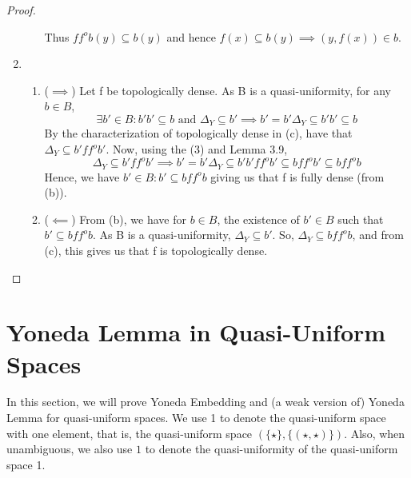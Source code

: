 \documentclass[a4paper]{article}
\theoremstyle{definition}
\begin{document}
\begin{proof}
\begin{enumerate}[label=(\alph*)]
\begin{enumerate}[label=(\roman*)]
					Thus $f f^o b(y) \subseteq b(y)$ and hence $f(x) \subseteq b(y) \implies
					(y,f(x)) \in b$.
			\end{enumerate}
		\item \begin{enumerate}[label=(\roman*)]
			\item
				($\implies $) Let f be topologically dense. As B is a quasi-uniformity, for any $b \in B$,
				\begin{equation}\exists b' \in B : b'b' \subseteq b \text{ and } \Delta_Y \subseteq b'
					\implies b'=b'\Delta_Y \subseteq b'b' \subseteq b
				\end{equation}
				By the characterization of topologically dense in (c), have that $\Delta_Y \subseteq b'f f^o b'$.
				Now, using the (3) and Lemma 3.9,
				\[ \Delta_Y \subseteq b'f f^o b' \implies b'=b'\Delta_Y \subseteq b'b'f f^o b' \subseteq bf f^o b'
				\subseteq bf f^o b\]
				Hence, we have $b'\in B : b' \subseteq bf f^o b$ giving us that f is fully dense (from (b)).
			\item ($\impliedby$) From (b), we have for $b \in B$, the existence of $b' \in B$ such that $
				b' \subseteq bf f^o b$. As B is a quasi-uniformity, $\Delta_Y \subseteq b'$. So,
				$\Delta_Y \subseteq bf f^o b$, and from (c), this gives us that f is topologically dense. \qedhere
		\end{enumerate}
\end{enumerate}
\end{proof}
\section{Yoneda Lemma in Quasi-Uniform Spaces}

In this section, we will prove Yoneda Embedding and (a weak version of) Yoneda Lemma
for quasi-uniform spaces.
We use 1 to denote the quasi-uniform space with one element, that is, the quasi-uniform space
$(\{\star\},\{(\star,\star)\})$. Also, when unambiguous, we also use $1$ to denote the
quasi-uniformity of the quasi-uniform space 1.
\end{document}

